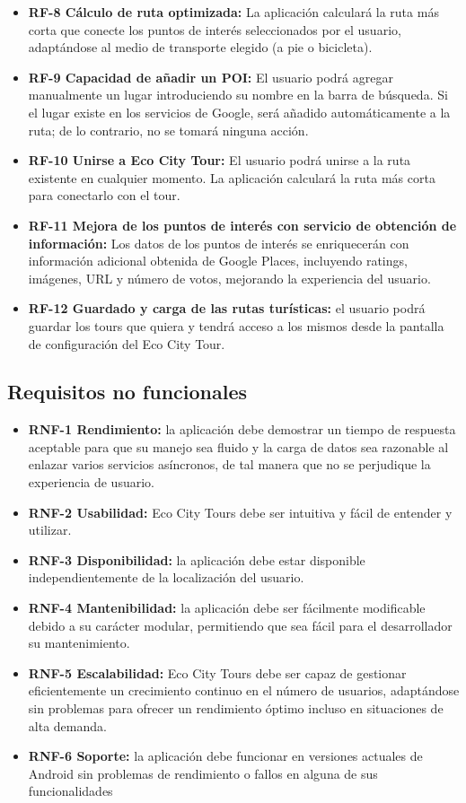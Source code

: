 \begin{itemize}
	\item \textbf{RF-8 Cálculo de ruta optimizada:} La aplicación calculará la ruta más corta que conecte los puntos de interés seleccionados por el usuario, adaptándose al medio de transporte elegido (a pie o bicicleta).
	
	\item \textbf{RF-9 Capacidad de añadir un POI:} El usuario podrá agregar manualmente un lugar introduciendo su nombre en la barra de búsqueda. Si el lugar existe en los servicios de Google, será añadido automáticamente a la ruta; de lo contrario, no se tomará ninguna acción.
	
	\item \textbf{RF-10 Unirse a Eco City Tour:} El usuario podrá unirse a la ruta existente en cualquier momento. La aplicación calculará la ruta más corta para conectarlo con el tour.
	
	\item \textbf{RF-11 Mejora de los puntos de interés con servicio de obtención de información:} Los datos de los puntos de interés se enriquecerán con información adicional obtenida de Google Places, incluyendo ratings, imágenes, URL y número de votos, mejorando la experiencia del usuario.
	
	\item \textbf{RF-12 Guardado y carga de las rutas turísticas:} el usuario podrá guardar los tours que quiera y tendrá acceso a los mismos desde la pantalla de configuración del Eco City Tour.
	
\end{itemize}

\subsection{Requisitos no funcionales}
\begin{itemize}
	\item \textbf{RNF-1 Rendimiento:} la aplicación debe demostrar un tiempo de respuesta aceptable para que su manejo sea fluido y la carga de datos sea razonable al enlazar varios servicios asíncronos, de tal manera que no se perjudique la experiencia de usuario. 
	\item \textbf{RNF-2 Usabilidad:} Eco City Tours debe ser intuitiva y fácil de entender y utilizar.
	\item \textbf{RNF-3 Disponibilidad:} la aplicación debe estar disponible independientemente de la localización del usuario.
	\item \textbf{RNF-4 Mantenibilidad:} la aplicación debe ser fácilmente modificable debido a su carácter modular, permitiendo que sea fácil para el desarrollador su mantenimiento.
	\item \textbf{RNF-5 Escalabilidad:} Eco City Tours debe ser capaz de gestionar eficientemente un crecimiento continuo en el número de usuarios, adaptándose sin problemas para ofrecer un rendimiento óptimo incluso en situaciones de alta demanda.
	\item \textbf{RNF-6 Soporte:} la aplicación debe funcionar en versiones actuales de Android sin problemas de rendimiento o fallos en alguna de sus funcionalidades
\end{itemize}
\clearpage
